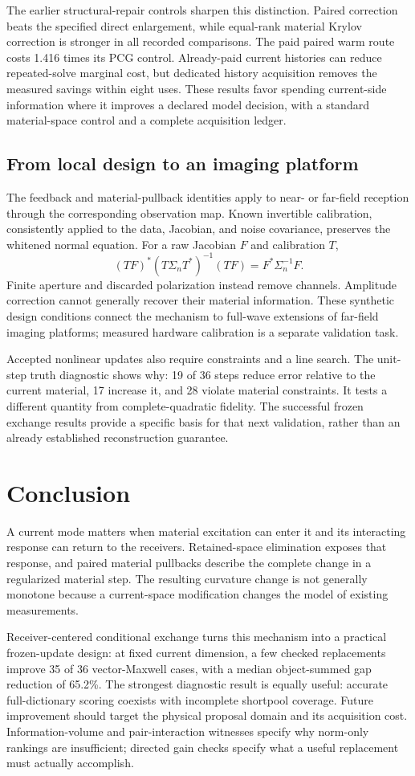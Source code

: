 The earlier structural-repair controls sharpen this distinction. Paired correction beats the specified direct enlargement, while equal-rank material Krylov correction is stronger in all recorded comparisons. The paid paired warm route costs 1.416 times its PCG control. Already-paid current histories can reduce repeated-solve marginal cost, but dedicated history acquisition removes the measured savings within eight uses. These results favor spending current-side information where it improves a declared model decision, with a standard material-space control and a complete acquisition ledger.

\subsection{From local design to an imaging platform}
The feedback and material-pullback identities apply to near- or far-field reception through the corresponding observation map. Known invertible calibration, consistently applied to the data, Jacobian, and noise covariance, preserves the whitened normal equation. For a raw Jacobian $F$ and calibration $T$,
\[
(TF)^*(T\Sigma_nT^*)^{-1}(TF)=F^*\Sigma_n^{-1}F.
\]
Finite aperture and discarded polarization instead remove channels. Amplitude correction cannot generally recover their material information. These synthetic design conditions connect the mechanism to full-wave extensions of far-field imaging platforms; measured hardware calibration is a separate validation task.

Accepted nonlinear updates also require constraints and a line search. The unit-step truth diagnostic shows why: 19 of 36 steps reduce error relative to the current material, 17 increase it, and 28 violate material constraints. It tests a different quantity from complete-quadratic fidelity. The successful frozen exchange results provide a specific basis for that next validation, rather than an already established reconstruction guarantee.

\section{Conclusion}
A current mode matters when material excitation can enter it and its interacting response can return to the receivers. Retained-space elimination exposes that response, and paired material pullbacks describe the complete change in a regularized material step. The resulting curvature change is not generally monotone because a current-space modification changes the model of existing measurements.

Receiver-centered conditional exchange turns this mechanism into a practical frozen-update design: at fixed current dimension, a few checked replacements improve 35 of 36 vector-Maxwell cases, with a median object-summed gap reduction of 65.2\%. The strongest diagnostic result is equally useful: accurate full-dictionary scoring coexists with incomplete shortpool coverage. Future improvement should target the physical proposal domain and its acquisition cost. Information-volume and pair-interaction witnesses specify why norm-only rankings are insufficient; directed gain checks specify what a useful replacement must actually accomplish.
